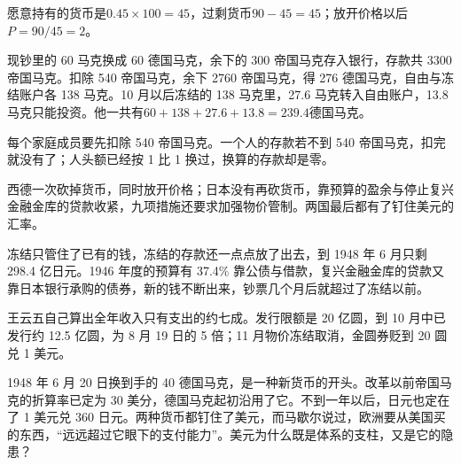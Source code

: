 \begin{answers}
\item 愿意持有的货币是$0.45\times100=45$，过剩货币$90-45=45$；放开价格以后$P=90/45=2$。
\item 现钞里的 60 马克换成 60 德国马克，余下的 300 帝国马克存入银行，存款共 3300 帝国马克。扣除 540 帝国马克，余下 2760 帝国马克，得 276 德国马克，自由与冻结账户各 138 马克。10 月以后冻结的 138 马克里，27.6 马克转入自由账户，13.8 马克只能投资。他一共有$60+138+27.6+13.8=239.4$德国马克。
\item 每个家庭成员要先扣除 540 帝国马克。一个人的存款若不到 540 帝国马克，扣完就没有了；人头额已经按 1 比 1 换过，换算的存款却是零。
\item 西德一次砍掉货币，同时放开价格；日本没有再砍货币，靠预算的盈余与停止复兴金融金库的贷款收紧，九项措施还要求加强物价管制。两国最后都有了钉住美元的汇率。
\item 冻结只管住了已有的钱，冻结的存款还一点点放了出去，到 1948 年 6 月只剩 298.4 亿日元。1946 年度的预算有 37.4\% 靠公债与借款，复兴金融金库的贷款又靠日本银行承购的债券，新的钱不断出来，钞票几个月后就超过了冻结以前。
\item 王云五自己算出全年收入只有支出的约七成。发行限额是 20 亿圆，到 10 月中已发行约 12.5 亿圆，为 8 月 19 日的 5 倍；11 月物价冻结取消，金圆券贬到 20 圆兑 1 美元。
\end{answers}

1948 年 6 月 20 日换到手的 40 德国马克，是一种新货币的开头。改革以前帝国马克的折算率已定为 30 美分，德国马克起初沿用了它\cite{buchheim1988}。不到一年以后，日元也定在了 1 美元兑 360 日元\cite{mof2010}。两种货币都钉住了美元，而马歇尔说过，欧洲要从美国买的东西，“远远超过它眼下的支付能力”\cite{marshall1947}。美元为什么既是体系的支柱，又是它的隐患？
